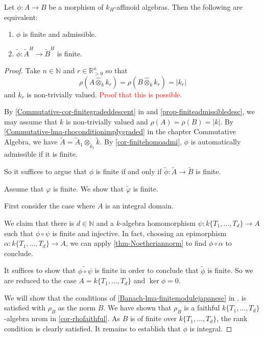 \begin{thm}\label{thm-reductionfinite}
    Let $\phi:A\rightarrow B$ be a morphism of $k_H$-affinoid algebras. Then the following are equivalent:
    \begin{enumerate}
        \item $\phi$ is finite and admissible.
        \item $\tilde{\phi}:\tilde{A}^H\rightarrow \tilde{B}^H$ is finite.
    \end{enumerate}
\end{thm}
\begin{proof}
    Take $n\in \mathbb{N}$ and $r\in \mathbb{R}^n_{>0}$ so that 
    \[
        \rho(A\hat{\otimes}_k k_r)=\rho(B\hat{\otimes}_k k_r)=|k_r|
    \]
    and $k_r$ is non-trivially valued. \textcolor{red}{Proof that this is possible.}

    By \cref{Commutative-cor-finitegradeddescent} in  and \cref{prop-finiteadmissibledesc},  we may assume that $k$ is non-trivially valued and $\rho(A)=\rho(B)=|k|$. By \cref{Commutative-lma-rhoconditionimplygraded} in  the chapter Commutative Algebra, we have $\tilde{A}=\tilde{A}_1\otimes_{\tilde{k}_1} \tilde{k}$. 
    By \cref{cor-finitehomoadmi}, $\phi$ is automatically admissible if it is finite. 
    
    So it suffices to argue that $\phi$ is finite if and only if $\tilde{\phi}:\tilde{A}\rightarrow \tilde{B}$ is finite. 
    
    Assume that $\varphi$ is finite. We show that $\tilde{\varphi}$ is finite. 

    First consider the case where $A$ is an integral domain. 
    
    We claim that there is $d\in \mathbb{N}$ and a $k$-algebra homomorphism $\psi:k\{T_1,\ldots,T_d\}\rightarrow A$ such that $\phi\circ \psi$ is finite and injective.  In fact, choosing an epimorphism $\alpha:k\{T_1,\ldots,T_d\}\rightarrow A$, we can apply \cref{thm-Noetheriannorm} to find $\phi\circ \alpha$ to conclude.

    It suffices to show that $\widetilde{\phi\circ\psi}$ is finite in order to conclude that $\tilde{\phi}$ is finite. So we are reduced to the case $A=k\{T_1,\ldots,T_d\}$ and $\ker \phi=0$.

    We will show that the conditions of \cref{Banach-lma-finitemodulejapanese} in . is satisfied with $\rho_B$ as the norm $B$. We have shown that $\rho_B$ is a faithful $k\{T_1,\ldots,T_d\}$-algebra nrom in \cref{cor-rhofaithful}. As $B$ is of finite over $k\{T_1,\ldots,T_d\}$, the rank condition is clearly satisfied. It remains to establish that $\mathring{\phi}$ is integral.


\end{proof}
